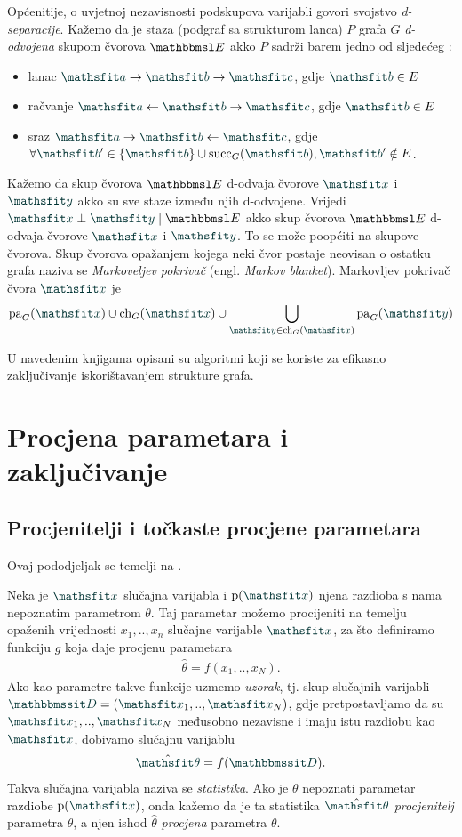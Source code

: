 \documentclass[utf8, diplomski, lmodern]{fer}
\begin{document}
Općenitije, o uvjetnoj nezavisnosti podskupova varijabli govori svojstvo \emph{d-separacije}. Kažemo da je staza (podgraf sa strukturom lanca) $P$ grafa $G$ \emph{d-odvojena} skupom čvorova $\set E$ akko $P$ sadrži barem jedno od sljedećeg \citep{Murphy:2012:MLPP}:
\begin{itemize}
	\item lanac $\rvar a\rightarrow\rvar b\rightarrow\rvar c$, gdje $\rvar b\in E$
	\item račvanje $\rvar a\leftarrow\rvar b\rightarrow\rvar c$, gdje $\rvar b\in E$
	\item sraz $\rvar a\rightarrow\rvar b\leftarrow\rvar c$, gdje $\forall \rvar b'\in\cbr{\rvar b}\cup\succ_G(\rvar b), \rvar b'\notin E$.
\end{itemize}
Kažemo da skup čvorova $\set E$ d-odvaja čvorove $\rvar x$ i $\rvar y$ akko su sve staze između njih d-odvojene. Vrijedi $\rvar x\perp\rvar y \mid \set E$ akko skup čvorova $\set E$ d-odvaja čvorove $\rvar x$ i $\rvar y$. To se može poopćiti na skupove čvorova. Skup čvorova opažanjem kojega neki čvor postaje neovisan o ostatku grafa naziva se \emph{Markoveljev pokrivač} (engl. \textit{Markov blanket}). Markovljev pokrivač čvora $\rvar x$ je
\begin{align}
\pa_G(\rvar x)\cup\ch_G(\rvar x)\cup\bigcup_{\rvar y\in\ch_G(\rvar x)}\pa_G(\rvar y)
\end{align}

U navedenim knjigama opisani su algoritmi koji se koriste za efikasno zaključivanje iskorištavanjem strukture grafa.


\section{Procjena parametara i zaključivanje}

\subsection{Procjenitelji i točkaste procjene parametara}

Ovaj pododjeljak se temelji na \citet{Elezovic:2007:VSSV}.

Neka je $\rvar x$ slučajna varijabla i $\p(\rvar x)$ njena razdioba s nama nepoznatim parametrom $\theta$. Taj parametar možemo procijeniti na temelju opaženih vrijednosti $x_1,..,x_n$ slučajne varijable $\rvar x$, za što definiramo funkciju $g$ koja daje procjenu parametara
\begin{align}
\hat{\theta}=f(x_1,..,x_N) \text{.}
\end{align}
Ako kao parametre takve funkcije uzmemo \emph{uzorak}, tj. skup slučajnih varijabli $\rset D=\del{\rvar x_1,..,\rvar x_N}$, gdje pretpostavljamo da su $\rvar x_1,..,\rvar x_N$ međusobno nezavisne i imaju istu razdiobu kao $\rvar x$, dobivamo slučajnu varijablu
\begin{align}
\hat{\rvar\theta}=f(\rset D) \text{.}
\end{align}
Takva slučajna varijabla naziva se \emph{statistika}. Ako je $\theta$ nepoznati parametar razdiobe $\p(\rvar x)$, onda kažemo da je ta statistika $\hat{\rvar\theta}$ \emph{procjenitelj} parametra $\theta$, a njen ishod $\hat{\theta}$ \emph{procjena} parametra $\theta$.
\end{document}
